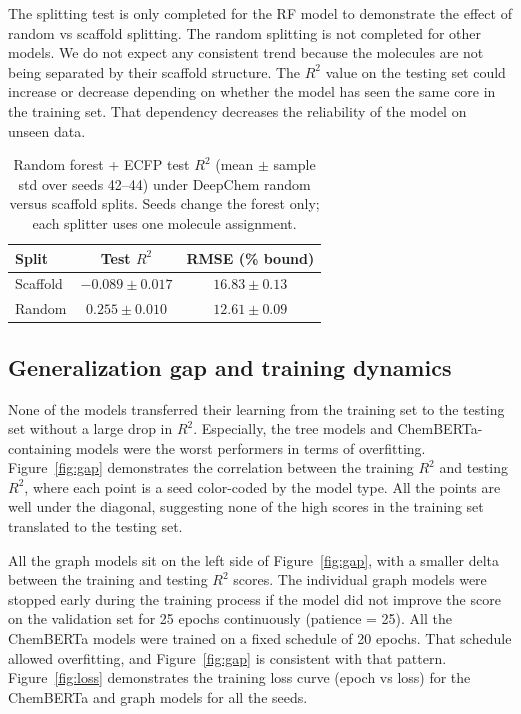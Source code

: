 \documentclass[11pt,a4paper]{article}
\begin{document}
The splitting test is only completed for the RF model to demonstrate the effect of random vs scaffold splitting.
The random splitting is not completed for other models.
We do not expect any consistent trend because the molecules are not being separated by their scaffold structure.
The $R^{2}$ value on the testing set could increase or decrease depending on whether the model has seen the same core in the training set.
That dependency decreases the reliability of the model on unseen data.

\begin{table}[H]
\centering
\caption{Random forest + ECFP test $R^{2}$ (mean $\pm$ sample std over seeds 42--44) under DeepChem random versus scaffold splits. Seeds change the forest only; each splitter uses one molecule assignment.}
\label{tab:random}
\begin{tabular}{lcc}
\toprule
\textbf{Split} & \textbf{Test $R^{2}$} & \textbf{RMSE (\% bound)} \\
\midrule
Scaffold & $-0.089 \pm 0.017$ & $16.83 \pm 0.13$ \\
Random & $0.255 \pm 0.010$ & $12.61 \pm 0.09$ \\
\bottomrule
\end{tabular}
\end{table}

\subsection{Generalization gap and training dynamics}
None of the models transferred their learning from the training set to the testing set without a large drop in $R^{2}$.
Especially, the tree models and ChemBERTa-containing models were the worst performers in terms of overfitting.
Figure~\ref{fig:gap} demonstrates the correlation between the training $R^{2}$ and testing $R^{2}$, where each point is a seed color-coded by the model type.
All the points are well under the diagonal, suggesting none of the high scores in the training set translated to the testing set.

All the graph models sit on the left side of Figure~\ref{fig:gap}, with a smaller delta between the training and testing $R^{2}$ scores.
The individual graph models were stopped early during the training process if the model did not improve the score on the validation set for 25 epochs continuously (patience = 25).
All the ChemBERTa models were trained on a fixed schedule of 20 epochs.
That schedule allowed overfitting, and Figure~\ref{fig:gap} is consistent with that pattern.
Figure~\ref{fig:loss} demonstrates the training loss curve (epoch vs loss) for the ChemBERTa and graph models for all the seeds.
\end{document}
